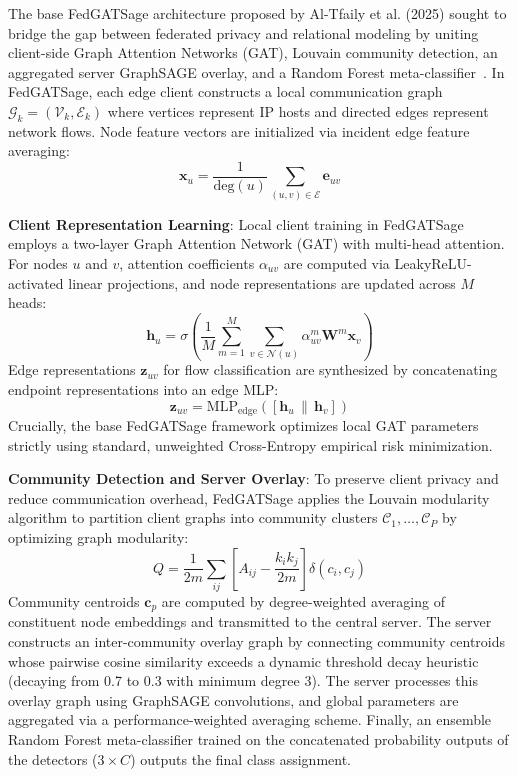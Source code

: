 \documentclass[12pt,a4paper]{report}
\begin{document}
The base FedGATSage architecture proposed by Al-Tfaily et al. (2025) sought to bridge the gap between federated privacy and relational modeling by uniting client-side Graph Attention Networks (GAT), Louvain community detection, an aggregated server GraphSAGE overlay, and a Random Forest meta-classifier~\cite{altfaily2025fedgatsage}. In FedGATSage, each edge client constructs a local communication graph $\mathcal{G}_k = (\mathcal{V}_k, \mathcal{E}_k)$ where vertices represent IP hosts and directed edges represent network flows. Node feature vectors are initialized via incident edge feature averaging:
\begin{equation}
\boldsymbol{x}_u = \frac{1}{\text{deg}(u)} \sum_{(u, v) \in \mathcal{E}} \boldsymbol{e}_{uv}
\end{equation}

\textbf{Client Representation Learning}: Local client training in FedGATSage employs a two-layer Graph Attention Network (GAT) with multi-head attention. For nodes $u$ and $v$, attention coefficients $\alpha_{uv}$ are computed via LeakyReLU-activated linear projections, and node representations are updated across $M$ heads:
\begin{equation}
\boldsymbol{h}_u = \sigma\left( \frac{1}{M} \sum_{m=1}^M \sum_{v \in \mathcal{N}(u)} \alpha_{uv}^m \boldsymbol{W}^m \boldsymbol{x}_v \right)
\end{equation}
Edge representations $\boldsymbol{z}_{uv}$ for flow classification are synthesized by concatenating endpoint representations into an edge MLP:
\begin{equation}
\boldsymbol{z}_{uv} = \text{MLP}_{\text{edge}}\left([\boldsymbol{h}_u \,\|\, \boldsymbol{h}_v]\right)
\end{equation}
Crucially, the base FedGATSage framework optimizes local GAT parameters strictly using standard, unweighted Cross-Entropy empirical risk minimization.

\textbf{Community Detection and Server Overlay}: To preserve client privacy and reduce communication overhead, FedGATSage applies the Louvain modularity algorithm to partition client graphs into community clusters $\mathcal{C}_1, \dots, \mathcal{C}_P$ by optimizing graph modularity:
\begin{equation}
Q = \frac{1}{2m} \sum_{ij} \left[ A_{ij} - \frac{k_i k_j}{2m} \right] \delta(c_i, c_j)
\end{equation}
Community centroids $\boldsymbol{c}_p$ are computed by degree-weighted averaging of constituent node embeddings and transmitted to the central server. The server constructs an inter-community overlay graph by connecting community centroids whose pairwise cosine similarity exceeds a dynamic threshold decay heuristic (decaying from 0.7 to 0.3 with minimum degree 3). The server processes this overlay graph using GraphSAGE convolutions, and global parameters are aggregated via a performance-weighted averaging scheme. Finally, an ensemble Random Forest meta-classifier trained on the concatenated probability outputs of the detectors ($3 \times C$) outputs the final class assignment.
\end{document}
